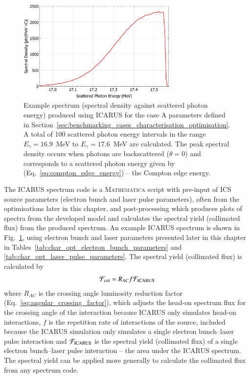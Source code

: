 \documentclass[../main.tex]{subfiles}
\begin{document}
\begin{figure}[!h]
\centering
\includegraphics[width=0.7\textwidth]{Figures/Optimisation_and_Characterisation_of_Inverse_Compton_Scattering_Sources/CaseA_example.pdf}
\caption{Example spectrum (spectral density against scattered photon energy) produced using \textsc{ICARUS} for the case A parameters defined in Section~\ref{sec:benchmarking_cases_characterisation_optimisation}. A total of 100 scattered photon energy intervals in the range $E_{\gamma} = 16.9$~\si{\mega\electronvolt} to $E_{\gamma} = 17.6$~\si{\mega\electronvolt} are calculated. The peak spectral density occurs when photons are backscattered ($\theta=0$) and corresponds to a scattered photon energy given by (Eq.~\ref{eq:compton_edge_energy}) -- the Compton edge energy. }
\label{fig:example_ICARUS_caseA}
\end{figure}
The \textsc{ICARUS} spectrum code is a \textsc{Mathematica} script with pre-input of ICS source parameters (electron bunch and laser pulse parameters), often from the optimisations later in this chapter, and post-processing which produces plots of spectra from the developed model and calculates the spectral yield (collimated flux) from the produced spectrum. An example \textsc{ICARUS} spectrum is shown in Fig.~\ref{fig:example_ICARUS_caseA}, using electron bunch and laser parameters presented later in this chapter in Tables~\ref{tab:char_opt_electron_bunch_parameters} and \ref{tab:char_opt_laser_pulse_parameters}. The spectral yield (collimated flux) is calculated by 
\begin{equation}
\mathcal{F}_{\mathrm{col}} = R_{AC}f\mathcal{F}_{\mathrm{\textsc{ICARUS}}}    
\label{eq:spectral_yield}
\end{equation}
where $R_{AC}$ is the crossing angle luminosity reduction factor (Eq.~\ref{eq:angular_crossing_factor}), which adjusts the head-on spectrum flux for the crossing angle of the interaction because \textsc{ICARUS} only simulates head-on interactions, $f$ is the repetition rate of interactions of the source, included because the \textsc{ICARUS} simulation only simulates a single electron bunch--laser pulse interaction and $\mathcal{F}_{\mathrm{\textsc{ICARUS}}}$ is the spectral yield (collimated flux) of a single electron bunch--laser pulse interaction -- the area under the \textsc{ICARUS} spectrum. The spectral yield can be applied more generally to calculate the collimated flux from any spectrum code. 
\end{document}
